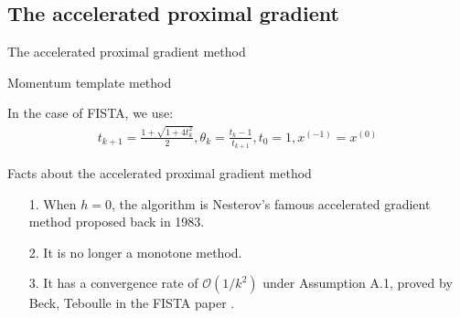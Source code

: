 \documentclass[11pt]{beamer}
\begin{document}
    \subsection{The accelerated proximal gradient}
        \begin{frame}{The accelerated proximal gradient method}
            \begin{block}{Momentum template method}
                {\scriptsize
                \begin{algorithm}[H]
                    \begin{algorithmic}[1]
                        \ENDFOR
                    \end{algorithmic}
                    \caption{Template proximal gradient method with momentum}\label{alg:fista_template}
                \end{algorithm}
                }
            \end{block}
            In the case of FISTA, we use: 
            \begin{align*}
                t_{k + 1} = \frac{1 + \sqrt{1 + 4t_k^2}}{2}, \theta_k = \frac{t_k - 1}{t_{k + 1}}, t_0 = 1, x^{(-1)} = x^{(0)}
            \end{align*}
        \end{frame}
        \begin{frame}{Facts about the accelerated proximal gradient method}
            \begin{itemize}
                \item [1.] When $h = 0$, the algorithm is Nesterov's famous accelerated gradient method proposed back in 1983. 
                \item [2.] It is no longer a monotone method. 
                \item [3.] It has a convergence rate of $\mathcal O(1/k^2)$ under Assumption A.1, proved by Beck, Teboulle in the FISTA paper \cite{paper:FISTA}. 
            \end{itemize}
        \end{frame}
    
\end{document}

